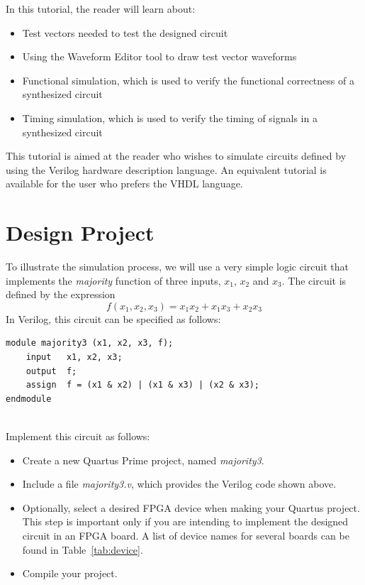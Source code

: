 \documentclass[11pt, twoside, pdftex]{article}
\begin{document}
In this tutorial, the reader will learn about:
\begin{itemize}
\item Test vectors needed to test the designed circuit
\item Using the Waveform Editor tool to draw test vector waveforms
\item Functional simulation, which is used to verify the functional 
correctness of a synthesized circuit
\item Timing simulation, which is used to verify the timing of signals in a synthesized circuit
\end{itemize}

This tutorial is aimed at the reader who wishes to simulate circuits defined
by using the Verilog hardware description language. An equivalent tutorial is
available for the user who prefers the VHDL language.

\section{Design Project}
\label{sec:design_project}
To illustrate the simulation process, we will use a very simple logic circuit that 
implements the {\it majority} function of three inputs, $x_1$, $x_2$ and $x_3$. The circuit
is defined by the expression
$$
f(x_1, x_2, x_3) = x_1 x_2 + x_1 x_3 + x_2 x_3
$$
\noindent
In Verilog, this circuit can be specified as follows:

\lstset{language=Verilog} 
\begin{center}
\begin{lstlisting}
module majority3 (x1, x2, x3, f);
	input	x1, x2, x3;
	output	f;
	assign	f = (x1 & x2) | (x1 & x3) | (x2 & x3);
endmodule 
\end{lstlisting}
\end{center}


\noindent
~\\
Implement this circuit as follows:
\begin{itemize}
\item Create a new Quartus Prime project, named {\it majority3}.
\item Include a file {\it majority3.v}, which provides the Verilog code shown above.
\item Optionally, select a desired FPGA device when making your Quartus project. This step 
is important only if you are intending to implement the designed circuit in an FPGA board. 
A list of device names for several boards can be found in Table~\ref{tab:device}.
\item Compile your project.
\end{itemize}
\end{document}
